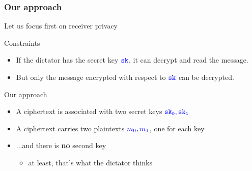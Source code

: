 \documentclass[handout]{beamer}
\begin{document}
\begin{frame}
\frametitle{Our approach}
Let us focus first on receiver privacy
\pause
\begin{block}{Constraints}
\begin{itemize}
\item If the dictator has the secret key $\color{blue} \mathtt{sk}$,
        it can decrypt and read the message.

\item But only the message encrypted with respect to $\color{blue} \mathtt{sk}$ can be decrypted.
\end{itemize}
\end{block}

\pause
\vfill

\begin{block}{Our approach}
\begin{itemize}
\item A ciphertext is associated with {\color{purple} two} secret keys 
$\color{blue} \mathtt{sk_0,sk_1}$
\item A ciphertext carries two plaintexts $\color{blue} m_0,m_1$,
one for each key
\item {\color{brown} ...and there is {\bf no} second key}
    \begin{itemize}
        \item at least, that's what the dictator thinks
    \end{itemize}
\end{itemize}
\end{block}

\end{frame}
\end{document}
